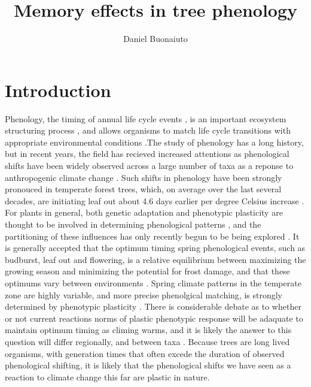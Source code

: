 \documentclass{article}\usepackage[]{graphicx}\usepackage[]{color}
\begin{document}
\title{Memory effects in tree phenology}
\author{Daniel Buonaiuto}
\data{\today}

\section*{Introduction}
\par Phenology, the timing of annual life cycle events \citep{}, is an important ecosystem structuring process \citep{}, and allows organisms to match life cycle transitions with appropriate environmental conditions \citep{}.The study of phenology has a long history, but in recent years, the field has recieved increased attentions as phenological shifts have been widely observed across a large number of taxa as a reponse to anthropogenic climate change \citep{Menzel2006}. Such shifts in phenology have been strongly pronouced in temperate forest trees, which, on average over the last several decades, are initiating leaf out about 4.6 days earlier per degree Celsius increase \citep{Polgar2014, Wolkovich2012}. For plants in general, both genetic adaptation and phenotypic plasticity are thought to be involved in determining phenological patterns \citep{}, and the partitioning of these influences has only recently begun to be being explored \citep{}. It is generally accepted that the optimum timing spring phenological events, such as budburst, leaf out and flowering, is a relative equilibrium between maximizing the growing season and minimizing the potential for frost damage, and that these optimums vary between environments \citep{Kramer1995}. Spring climate patterns in the temperate zone are highly variable, and more precise phenolgical matching, is strongly determined by phenotypic plasticity \citep{}. There is considerable debate as to whether or not current reactions norms of plastic phenotypic response will be adaquate to maintain optimum timing as climing warms, and it is likely the answer to this question will differ regionally, and between taxa \citep{}. Because trees are long lived organisms, with generation times that often excede the duration of observed phenological shifting, it is likely that the phenological shifts we have seen as a reaction to climate change this far are plastic in nature.
\end{document}
